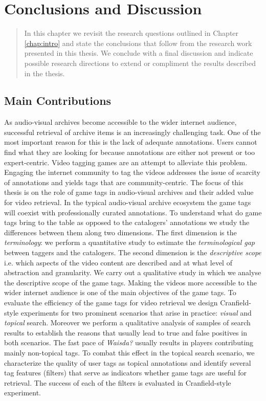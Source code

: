\chapter{Conclusions and Discussion}\label{chap:conclusion}
\begin{quotation}
\noindent 
In this chapter we revisit the research questions outlined in Chapter \ref{chap:intro} and state the conclusions that follow from the research work presented in this thesis. We conclude with a final discussion and indicate possible research directions to extend or compliment the results described in the thesis.  
\end{quotation}

\section{Main Contributions}
As audio-visual archives become accessible to the wider internet audience, successful retrieval of archive items is an increasingly challenging task. One of the most important reason for this is the lack of adequate annotations. Users cannot find what they are looking for because annotations are either not
present or too expert-centric. Video tagging games are an attempt to alleviate this problem. Engaging the internet community to tag the videos addresses the issue of scarcity of annotations and yields tags that are community-centric. The focus of this thesis is on the role of game tags in audio-visual archives and their added value for video retrieval. In the typical audio-visual archive ecosystem the game tags will coexist with professionally curated annotations. To understand what do game tags bring to the table as opposed to the catalogers' annotations we study the differences between them along two dimensions. The first dimension is the \textit{terminology}: we perform a quantitative study to estimate the \textit{terminological gap} between taggers and the catalogers. The second dimension is the \textit{descriptive scope} i.e. which aspects of the video content are described and at what level of abstraction and granularity. We carry out a qualitative study in which we analyse the descriptive scope of the game tags. Making the videos more accessible to the wider internet audience is one of the main objectives of the game tags. To evaluate the efficiency of the game tags for video retrieval we design Cranfield-style experiments for two prominent scenarios that arise in practice: \textit{visual} and \textit{topical} search. Moreover we perform a qualitative analysis of samples of search results to establish the reasons that usually lead to true and false positives in both scenarios. The fast pace of \textit{Waisda?} usually results in players contributing mainly non-topical tags. To combat this effect in the topical search scenario, we characterize the quality of user tags as topical annotations and identify several tag features (filters) that serve as indicators whether game tags are useful for retrieval. The success of each of the filters is evaluated in Cranfield-style experiment.

